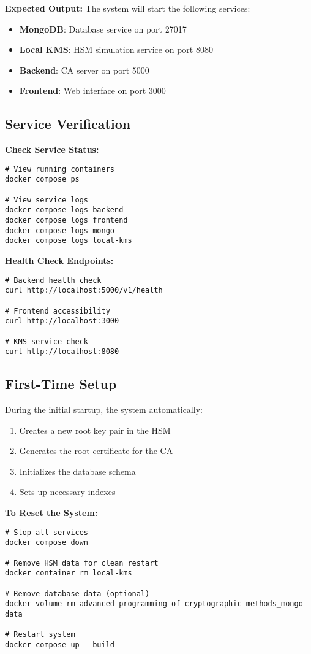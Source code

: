 \textbf{Expected Output:}
The system will start the following services:
\begin{itemize}
    \item \textbf{MongoDB}: Database service on port 27017
    \item \textbf{Local KMS}: HSM simulation service on port 8080
    \item \textbf{Backend}: CA server on port 5000
    \item \textbf{Frontend}: Web interface on port 3000
\end{itemize}

\subsection{Service Verification}

\textbf{Check Service Status:}
\begin{verbatim}
# View running containers
docker compose ps

# View service logs
docker compose logs backend
docker compose logs frontend
docker compose logs mongo
docker compose logs local-kms
\end{verbatim}

\textbf{Health Check Endpoints:}
\begin{verbatim}
# Backend health check
curl http://localhost:5000/v1/health

# Frontend accessibility
curl http://localhost:3000

# KMS service check
curl http://localhost:8080
\end{verbatim}

\subsection{First-Time Setup}

During the initial startup, the system automatically:
\begin{enumerate}
    \item Creates a new root key pair in the HSM
    \item Generates the root certificate for the CA
    \item Initializes the database schema
    \item Sets up necessary indexes
\end{enumerate}

\textbf{To Reset the System:}
\begin{verbatim}
# Stop all services
docker compose down

# Remove HSM data for clean restart
docker container rm local-kms

# Remove database data (optional)
docker volume rm advanced-programming-of-cryptographic-methods_mongo-data

# Restart system
docker compose up --build
\end{verbatim}

